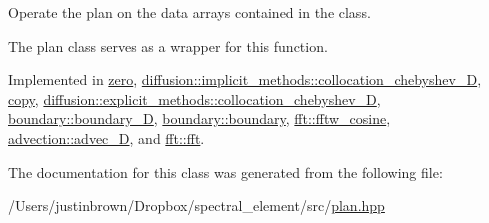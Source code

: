 Operate the plan on the data arrays contained in the class. 



 The plan class serves as a wrapper for this function. 

Implemented in \hyperlink{classzero_a5d8c7f5d0f82a404f8ac9d543f355709}{zero}, \hyperlink{classdiffusion_1_1implicit__methods_1_1collocation__chebyshev__1_d_ac5682ef7086a8f907318d8f031dc73f4}{diffusion\-::implicit\-\_\-methods\-::collocation\-\_\-chebyshev\-\_\-D}, \hyperlink{classcopy_aab79ea3f2ca10478e63028b146f2e6dc}{copy}, \hyperlink{classdiffusion_1_1explicit__methods_1_1collocation__chebyshev__1_d_aeec709b2ee1d487df3b7b9f854e55047}{diffusion\-::explicit\-\_\-methods\-::collocation\-\_\-chebyshev\-\_\-D}, \hyperlink{classboundary_1_1boundary__1_d_a10d56aff9623f0886de1d9f0eb991863}{boundary\-::boundary\-\_\-D}, \hyperlink{classboundary_1_1boundary_ad5c7967ab2e710a86d1d89d4600c7568}{boundary\-::boundary}, \hyperlink{classfft_1_1fftw__cosine_ace4fa808683bc426c4e2acc52ac955a7}{fft\-::fftw\-\_\-cosine}, \hyperlink{classadvection_1_1advec__1_d_a9d4d3fb973c1ecc8c1dbd5f4f191b112}{advection\-::advec\-\_\-D}, and \hyperlink{classfft_1_1fft_ac562cb93b9f0587991fc238d64754555}{fft\-::fft}.



The documentation for this class was generated from the following file\-:\begin{DoxyCompactItemize}
\item 
/\-Users/justinbrown/\-Dropbox/spectral\-\_\-element/src/\hyperlink{plan_8hpp}{plan.\-hpp}\end{DoxyCompactItemize}

